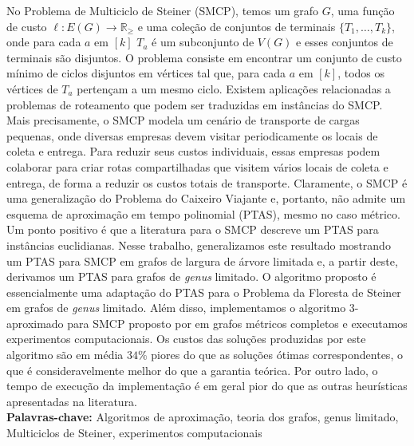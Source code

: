 
No Problema de Multiciclo de Steiner (SMCP), temos um grafo \(G\), uma função de custo $\ell \colon E(G) \to \mathbb{R}_\ge$ e uma coleção de conjuntos de terminais \(\{T_1, \dots , T_k\}\), onde para cada \(a\) em \([k]\) \(T_a\) é um subconjunto de \(V(G)\) e esses conjuntos de terminais são disjuntos. O problema consiste em encontrar um conjunto de custo mínimo de ciclos disjuntos em vértices tal que, para cada \(a\) em \([k]\), todos os vértices de \(T_a\) pertençam a um mesmo ciclo.
Existem aplicações relacionadas a problemas de roteamento que podem ser traduzidas em instâncias do SMCP.
Mais precisamente, o SMCP modela um cenário de transporte de cargas pequenas, onde diversas empresas devem visitar periodicamente os locais de coleta e entrega.
Para reduzir seus custos individuais, essas empresas podem colaborar para criar rotas compartilhadas que visitem vários locais de coleta e entrega, de forma a reduzir os custos totais de transporte.
Claramente, o SMCP é uma generalização do Problema do Caixeiro Viajante e, portanto, não admite um esquema de aproximação em tempo polinomial (PTAS), mesmo no caso métrico.
Um ponto positivo é que a literatura para o SMCP descreve um PTAS para instâncias euclidianas. Nesse trabalho, generalizamos este resultado mostrando um PTAS para SMCP em grafos de largura de árvore limitada e, a partir deste, derivamos um PTAS para grafos de \textit{genus} limitado.
O algoritmo proposto é essencialmente uma adaptação do PTAS para o Problema da Floresta de Steiner em grafos de \textit{genus} limitado.
Além disso, implementamos o algoritmo 3-aproximado para SMCP proposto por \cite{smcp_3apx} em grafos métricos completos e executamos experimentos computacionais.
Os custos das soluções produzidas por este algoritmo são em média \(34\%\) piores do que as soluções ótimas correspondentes, o que é consideravelmente melhor do que a garantia teórica.
Por outro lado, o tempo de execução da implementação é em geral pior do que as outras heurísticas apresentadas na literatura.
\hfill\\

\noindent\textbf{Palavras-chave:} Algoritmos de aproximação, teoria dos grafos, genus limitado, Multiciclos de Steiner, experimentos computacionais